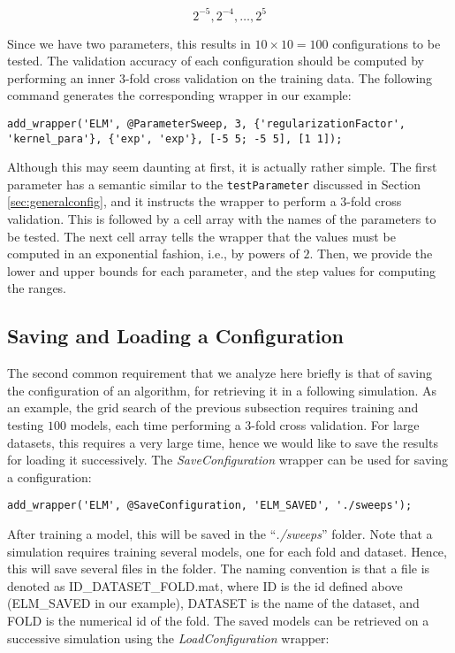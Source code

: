 \begin{equation}
2^{-5}, 2^{-4}, \dots, 2^{5}
\end{equation}

\noindent Since we have two parameters, this results in $10 \times 10 = 100$ configurations to be tested. The validation accuracy of each configuration should be computed by performing an inner $3$-fold cross validation on the training data. The following command generates the corresponding wrapper in our example:

\newpage

\begin{lstlisting}
add_wrapper('ELM', @ParameterSweep, 3, {'regularizationFactor', 'kernel_para'}, {'exp', 'exp'}, [-5 5; -5 5], [1 1]);
\end{lstlisting}

\noindent Although this may seem daunting at first, it is actually rather simple. The first parameter has a semantic similar to the \verb|testParameter| discussed in Section \ref{sec:generalconfig}, and it instructs the wrapper to perform a $3$-fold cross validation. This is followed by a cell array with the names of the parameters to be tested. The next cell array tells the wrapper that the values must be computed in an exponential fashion, i.e., by powers of $2$. Then, we provide the lower and upper bounds for each parameter, and the step values for computing the ranges.

\subsection{Saving and Loading a Configuration}

The second common requirement that we analyze here briefly is that of saving the configuration of an algorithm, for retrieving it in a following simulation. As an example, the grid search of the previous subsection requires training and testing $100$ models, each time performing a $3$-fold cross validation. For large datasets, this requires a very large time, hence we would like to save the results for loading it successively. The \textit{SaveConfiguration} wrapper can be used for saving a configuration:

\begin{lstlisting}
add_wrapper('ELM', @SaveConfiguration, 'ELM_SAVED', './sweeps');
\end{lstlisting}

\noindent After training a model, this will be saved in the ``\textit{./sweeps}'' folder. Note that a simulation requires training several models, one for each fold and dataset. Hence, this will save several files in the folder. The naming convention is that a file is denoted as ID\_DATASET\_FOLD.mat, where ID is the id defined above (ELM\_SAVED in our example), DATASET is the name of the dataset, and FOLD is the numerical id of the fold. The saved models can be retrieved on a successive simulation using the \textit{LoadConfiguration} wrapper:

